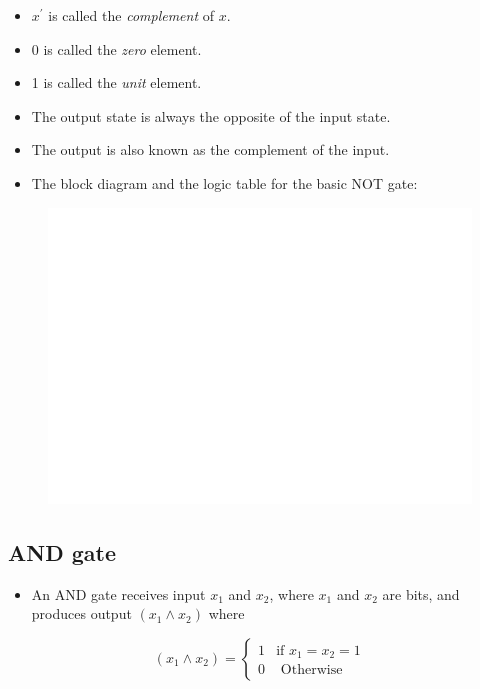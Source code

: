 \documentclass[]{book}
\providecommand{\tightlist}{%
  \setlength{\itemsep}{0pt}\setlength{\parskip}{0pt}}
\begin{document}
\begin{itemize}
\tightlist
\item
  \(x^\prime\) is called the \emph{complement} of \(x\).
\item
  0 is called the \emph{zero} element.
\item
  1 is called the \emph{unit} element.
\item
  The output state is always the opposite of the input state.
\item
  The output is also known as the complement of the input.
\item
  The block diagram and the logic table for the basic NOT gate:
\end{itemize}

\begin{figure}

{\centering \includegraphics[width=1\linewidth]{figure/boxC41-1} 

}

\end{figure}

\hypertarget{and-gate}{%
\subsection{AND gate}\label{and-gate}}

\begin{itemize}
\tightlist
\item
  An AND gate receives input \(x_1\) and \(x_2\), where \(x_1\) and \(x_2\) are bits, and produces output \((x_1 \land x_2)\) where
\end{itemize}

\begin{equation}
(x_1 \land x_2) =
\begin{cases} 
1 & \text{if } x_1=x_2=1\\
0 & \text{ Otherwise }
\end{cases}
\end{equation}
\end{document}
